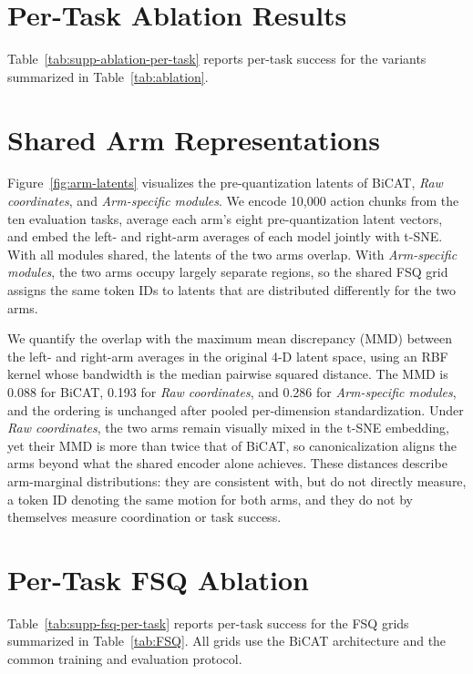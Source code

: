 \section{Per-Task Ablation Results}
\label{app:ablation-per-task}

Table~\ref{tab:supp-ablation-per-task} reports per-task success for the
variants summarized in Table~\ref{tab:ablation}.


\section{Shared Arm Representations}
\label{app:arm-latents}

Figure~\ref{fig:arm-latents} visualizes the pre-quantization latents of
BiCAT, \emph{Raw coordinates}, and \emph{Arm-specific modules}. We encode
10,000 action chunks from the ten evaluation tasks, average each arm's eight
pre-quantization latent vectors, and embed the left- and right-arm averages
of each model jointly with t-SNE. With all modules shared, the latents of
the two arms overlap. With \emph{Arm-specific modules}, the two arms occupy
largely separate regions, so the shared FSQ grid assigns the same token IDs
to latents that are distributed differently for the two arms.

We quantify the overlap with the maximum mean discrepancy (MMD) between the
left- and right-arm averages in the original 4-D latent space, using an RBF
kernel whose bandwidth is the median pairwise squared distance. The MMD is
0.088 for BiCAT, 0.193 for \emph{Raw coordinates}, and 0.286 for
\emph{Arm-specific modules}, and the ordering is unchanged after pooled
per-dimension standardization. Under \emph{Raw coordinates}, the two arms
remain visually mixed in the t-SNE embedding, yet their MMD is more than
twice that of BiCAT, so canonicalization aligns the arms beyond what the
shared encoder alone achieves. These distances describe arm-marginal
distributions: they are consistent with, but do not directly measure, a
token ID denoting the same motion for both arms, and they do not by
themselves measure coordination or task success.


\section{Per-Task FSQ Ablation}
\label{app:fsq-per-task}

Table~\ref{tab:supp-fsq-per-task} reports per-task success for the FSQ
grids summarized in Table~\ref{tab:FSQ}. All grids use the BiCAT
architecture and the common training and evaluation protocol.


